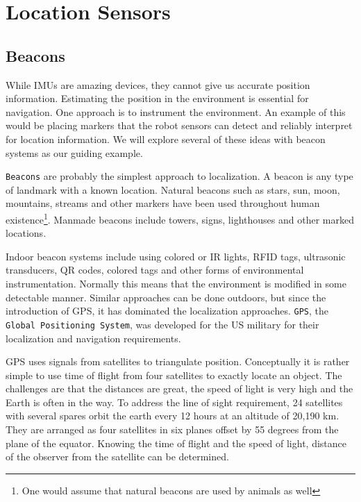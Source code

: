 \hypertarget{location-sensors}{%
\section{Location Sensors}\label{location-sensors}}

\hypertarget{beacons}{%
\subsection{Beacons}\label{beacons}}

While IMUs are amazing devices, they cannot give us accurate position
information. Estimating the position in the environment is essential for
navigation. One approach is to instrument the environment. An example of
this would be placing markers that the robot sensors can detect and
reliably interpret for location information. We will explore several of
these ideas with beacon systems as our guiding example.

\texttt{Beacons} are probably the simplest approach to localization. A
beacon is any type of landmark with a known location. Natural beacons
such as stars, sun, moon, mountains, streams and other markers have been
used throughout human existence\footnote{One would assume that natural
  beacons are used by animals as well}. Manmade beacons include towers,
signs, lighthouses and other marked locations.

Indoor beacon systems include using colored or IR lights, RFID tags,
ultrasonic transducers, QR codes, colored tags and other forms of
environmental instrumentation. Normally this means that the environment
is modified in some detectable manner. Similar approaches can be done
outdoors, but since the introduction of GPS, it has dominated the
localization approaches. \texttt{GPS}, the
\texttt{Global\ Positioning\ System}, was developed for the US military
for their localization and navigation requirements.

GPS uses signals from satellites to triangulate position. Conceptually
it is rather simple to use time of flight from four satellites to
exactly locate an object. The challenges are that the distances are
great, the speed of light is very high and the Earth is often in the
way. To address the line of sight requirement, 24 satellites with
several spares orbit the earth every 12 hours at an altitude of 20,190
km. They are arranged as four satellites in six planes offset by 55
degrees from the plane of the equator. Knowing the time of flight and
the speed of light, distance of the observer from the satellite can be
determined.

